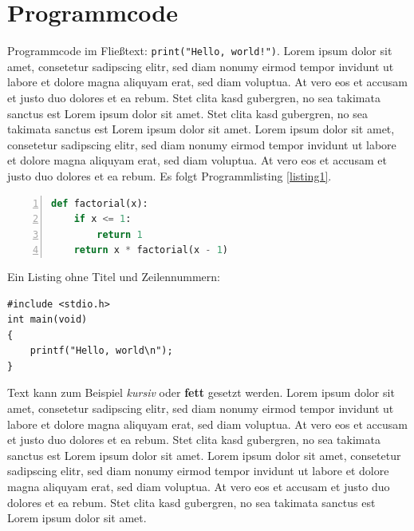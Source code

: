 \documentclass[a4paper, twoside]{IEEEtran}
\begin{document}
\section{Programmcode}

Programmcode im Fließtext: \lstinline{print("Hello, world!")}.
Lorem ipsum dolor sit amet, consetetur sadipscing elitr, sed diam nonumy eirmod tempor invidunt ut labore et dolore magna aliquyam erat, sed diam voluptua. At vero eos et accusam et justo duo dolores et ea rebum. Stet clita kasd gubergren, no sea takimata sanctus est Lorem ipsum dolor sit amet. Stet clita kasd gubergren, no sea takimata sanctus est Lorem ipsum dolor sit amet. Lorem ipsum dolor sit amet, consetetur sadipscing elitr, sed diam nonumy eirmod tempor invidunt ut labore et dolore magna aliquyam erat, sed diam voluptua. At vero eos et accusam et justo duo dolores et ea rebum.
Es folgt Programmlisting \ref{listing1}.

\begin{lstlisting}[caption={Beschreibung des Listings.}, language=Python, label=listing1, numbers=left, xleftmargin=6mm]
def factorial(x):
    if x <= 1:
        return 1
    return x * factorial(x - 1)
\end{lstlisting}
Ein Listing ohne Titel und Zeilennummern:

\begin{lstlisting}
#include <stdio.h>
int main(void)
{
    printf("Hello, world\n");
}
\end{lstlisting}
Text kann zum Beispiel \emph{kursiv} oder \textbf{fett} gesetzt werden.
Lorem ipsum dolor sit amet, consetetur sadipscing elitr, sed diam nonumy eirmod tempor invidunt ut labore et dolore magna aliquyam erat, sed diam voluptua. At vero eos et accusam et justo duo dolores et ea rebum. Stet clita kasd gubergren, no sea takimata sanctus est Lorem ipsum dolor sit amet. Lorem ipsum dolor sit amet, consetetur sadipscing elitr, sed diam nonumy eirmod tempor invidunt ut labore et dolore magna aliquyam erat, sed diam voluptua. At vero eos et accusam et justo duo dolores et ea rebum. Stet clita kasd gubergren, no sea takimata sanctus est Lorem ipsum dolor sit amet.



\printbibliography
\end{document}

